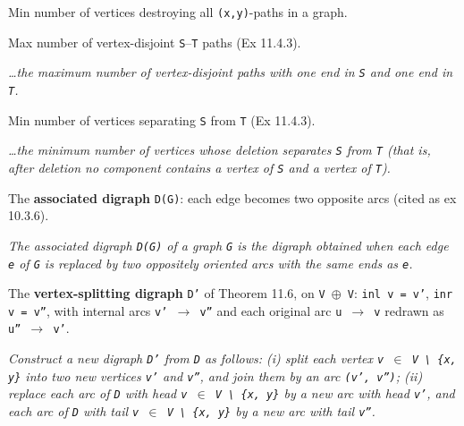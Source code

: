 \begin{definition}
\label{Networks.minVerticesDestroyingPaths}
Min number of vertices destroying all \texttt{(x,y)}-paths in a graph.
\end{definition}

\begin{definition}
\label{Networks.maxSTVertexDisjointPaths}
Max number of vertex-disjoint \texttt{S}--\texttt{T} paths (Ex 11.4.3).

\emph{\dots{}the maximum number of
vertex-disjoint paths with one end in \texttt{S} and one end in \texttt{T}.}
\end{definition}

\begin{definition}
\label{Networks.minSTSeparator}
Min number of vertices separating \texttt{S} from \texttt{T} (Ex 11.4.3).

\emph{\dots{}the minimum number of vertices
whose deletion separates \texttt{S} from \texttt{T} (that is, after deletion no
component contains
a vertex of \texttt{S} and a vertex of \texttt{T}).}
\end{definition}

\begin{definition}
\label{Networks.associatedDigraph}
The \textbf{associated digraph} \texttt{D(G)}: each edge becomes two opposite arcs
(cited as ex 10.3.6).

\emph{The associated digraph \texttt{D(G)}
of a graph \texttt{G} is the digraph obtained when each edge \texttt{e} of \texttt{G} is
replaced by two
oppositely oriented arcs with the same ends as \texttt{e}.}
\end{definition}

\begin{definition}[The vertex-splitting digraph $D'$ of Theorem 11.6, on $V \oplus V$: \texttt{inl v = v'}, \texttt{inr v =\dots}]
\label{Networks.splitDigraph}
\leanok
The \textbf{vertex-splitting digraph} \texttt{D'} of Theorem 11.6, on \texttt{V $\oplus$
V}: \texttt{inl v = v'}, \texttt{inr v = v''},
with internal arcs \texttt{v' $\to$ v''} and each original arc \texttt{u $\to$ v}
redrawn as \texttt{u'' $\to$ v'}.

\emph{Construct a new
digraph \texttt{D'} from \texttt{D} as follows: (i) split each vertex \texttt{v $\in$ V
\textbackslash{} \{x, y\}} into two
new vertices \texttt{v'} and \texttt{v''}, and join them by an arc \texttt{(v', v'')};
(ii) replace each
arc of \texttt{D} with head \texttt{v $\in$ V \textbackslash{} \{x, y\}} by a new arc
with head \texttt{v'}, and each arc of
\texttt{D} with tail \texttt{v $\in$ V \textbackslash{} \{x, y\}} by a new arc with tail \texttt{v''}.}
\end{definition}


